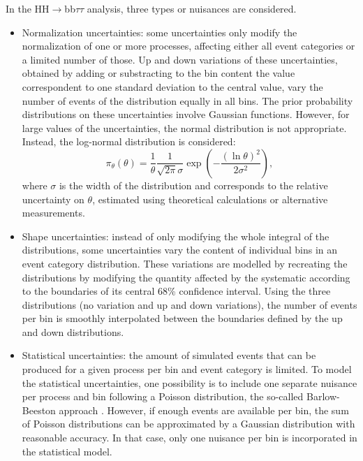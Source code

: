 \documentclass[../main.tex]{subfiles}
\begin{document}
In the HH$\to$bb$\tau\tau$ analysis, three types or nuisances are considered. 
\begin{itemize}
\item Normalization uncertainties: some uncertainties only modify the normalization of one or more processes, affecting either all event categories or a limited number of those. Up and down variations of these uncertainties, obtained by adding or substracting to the bin content the value correspondent to one standard deviation to the central value, vary the number of events of the distribution equally in all bins. The prior probability distributions on these uncertainties involve Gaussian functions. However, for large values of the uncertainties, the normal distribution is not appropriate. Instead, the log-normal distribution is considered:
\begin{equation}
\pi_\theta(\theta) = \frac{1}{\theta}\frac{1}{\sqrt{2\pi}\sigma}\exp\left(-\frac{(\ln\theta)^2}{2\sigma^2}\right),
\end{equation}
where $\sigma$ is the width of the distribution and corresponds to the relative uncertainty on $\theta$, estimated using theoretical calculations or alternative measurements.

\item Shape uncertainties: instead of only modifying the whole integral of the distributions, some uncertainties vary the content of individual bins in an event category distribution. These variations are modelled by recreating the distributions by modifying the quantity affected by the systematic according to the boundaries of its central 68\% confidence interval. Using the three distributions (no variation and up and down variations), the number of events per bin is smoothly interpolated between the boundaries defined by the up and down distributions.

\item Statistical uncertainties: the amount of simulated events that can be produced for a given process per bin and event category is limited. To model the statistical uncertainties, one possibility is to include one separate nuisance per process and bin following a Poisson distribution, the so-called Barlow-Beeston approach  \cite{hh:results:barlow_beeston}. However, if enough events are available per bin, the sum of Poisson distributions can be approximated by a Gaussian distribution with reasonable accuracy. In that case, only one nuisance per bin is incorporated in the statistical model.
\end{itemize}
\end{document}

